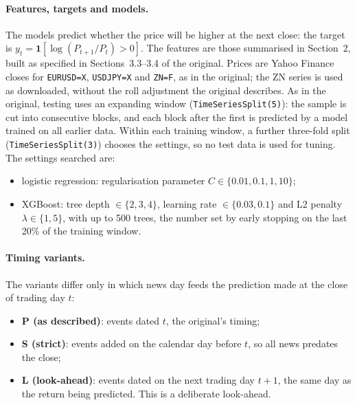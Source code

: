 \documentclass[11pt]{article}
\begin{document}
\paragraph{Features, targets and models.} The models predict whether the price will be higher at the next close: the target is $y_t=\mathbf{1}[\log(P_{t+1}/P_t)>0]$. The features are those summarised in
Section~2, built as specified in Sections~3.3--3.4 of the original. Prices are Yahoo Finance closes for
\texttt{EURUSD=X}, \texttt{USDJPY=X} and \texttt{ZN=F}, as in the original; the ZN series is used as
downloaded, without the roll adjustment the original describes. As in the original, testing uses an expanding window
(\texttt{TimeSeriesSplit(5)}): the sample is cut into consecutive blocks, and each block after the first is
predicted by a model trained on all earlier data. Within each training window, a further three-fold split
(\texttt{TimeSeriesSplit(3)}) chooses the settings, so no test data is used for tuning. The settings searched
are:
\begin{itemize}
  \item logistic regression: regularisation parameter $C\in\{0.01,0.1,1,10\}$;
  \item XGBoost: tree depth $\in\{2,3,4\}$, learning rate $\in\{0.03,0.1\}$ and L2 penalty $\lambda\in\{1,5\}$, with
        up to 500 trees, the number set by early stopping on the last 20\% of the training window.
\end{itemize}

\paragraph{Timing variants.} The variants differ only in which news day feeds the prediction made at the close of
trading day $t$:
\begin{itemize}
  \item \textbf{P (as described)}: events dated $t$, the original's timing;
  \item \textbf{S (strict)}: events added on the calendar day before $t$, so all news predates the close;
  \item \textbf{L (look-ahead)}: events dated on the next trading day $t{+}1$, the same day as the return being
        predicted. This is a deliberate look-ahead.
\end{itemize}
\end{document}
